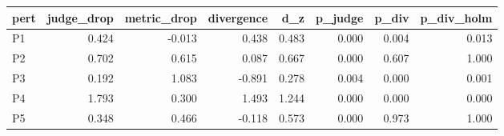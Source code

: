 \begin{tabular}{lrrrrrrr}
\toprule
pert & judge_drop & metric_drop & divergence & d_z & p_judge & p_div & p_div_holm \\
\midrule
P1 & 0.424 & -0.013 & 0.438 & 0.483 & 0.000 & 0.004 & 0.013 \\
P2 & 0.702 & 0.615 & 0.087 & 0.667 & 0.000 & 0.607 & 1.000 \\
P3 & 0.192 & 1.083 & -0.891 & 0.278 & 0.004 & 0.000 & 0.001 \\
P4 & 1.793 & 0.300 & 1.493 & 1.244 & 0.000 & 0.000 & 0.000 \\
P5 & 0.348 & 0.466 & -0.118 & 0.573 & 0.000 & 0.973 & 1.000 \\
\bottomrule
\end{tabular}
